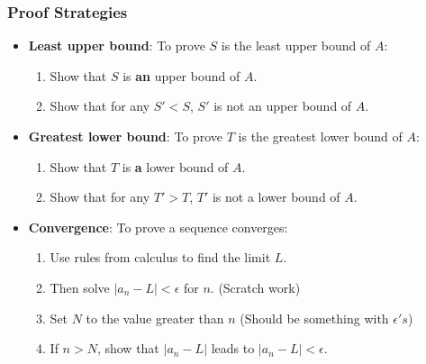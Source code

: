 \documentclass{article}
\newcommand{\abs}[1] {
  \left| #1 \right|
}
\begin{document}
\begin{multicols}{3}
  \subsubsection*{Proof Strategies}
  \begin{itemize}
  \item \textbf{Least upper bound}: To prove $S$ is the least upper bound of $A$:
    \begin{enumerate}
    \item Show that $S$ is \textbf{an} upper bound of $A$.
    \item Show that for any $S' < S$, $S'$ is not an upper bound of $A$.
    \end{enumerate}
  \item \textbf{Greatest lower bound}: To prove $T$ is the greatest lower bound of $A$:   
    \begin{enumerate}
      \item Show that $T$ is \textbf{a} lower bound of $A$.
      \item Show that for any $T' > T$, $T'$ is not a lower bound of $A$.
    \end{enumerate}
  \item \textbf{Convergence}: To prove a sequence converges: 
    \begin{enumerate}
    \item Use rules from calculus to find the limit $L$.
    \item Then solve $\abs{a_n - L} < \epsilon$ for $n$. (Scratch work)
    \item Set $N$ to the value greater than $n$ (Should be something with $\epsilon 's$)
    \item If $n > N$, show that $\abs{a_n - L}$ leads to $\abs{a_n - L} < \epsilon$.
    \end{enumerate}
  \end{itemize}

  
  
\end{multicols}
\end{document}

